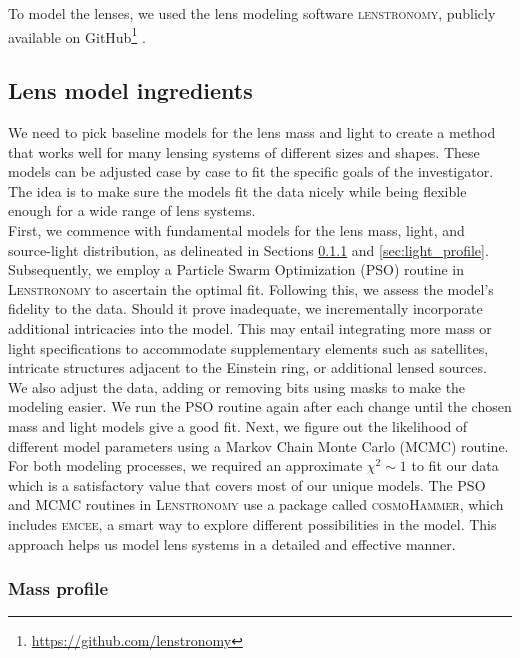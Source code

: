 \documentclass{aa}
\begin{document}
To model the lenses, we used the lens modeling software \textsc{lenstronomy}, publicly available on GitHub\footnote{\url{https://github.com/lenstronomy}} \citep{Birrer15, Birrer18}.

\subsection{Lens model ingredients}
We need to pick baseline models for the lens mass and light to create a method that works well for many lensing systems of different sizes and shapes. These models can be adjusted case by case to fit the specific goals of the investigator. The idea is to make sure the models fit the data nicely while being flexible enough for a wide range of lens systems.\\

First, we commence with fundamental models for the lens mass, light, and source-light distribution, as delineated in Sections \ref{sec:mass_profile} and \ref{sec:light_profile}. Subsequently, we employ a Particle Swarm Optimization (PSO) routine in \textsc{Lenstronomy} to ascertain the optimal fit. Following this, we assess the model's fidelity to the data. Should it prove inadequate, we incrementally incorporate additional intricacies into the model. This may entail integrating more mass or light specifications to accommodate supplementary elements such as satellites, intricate structures adjacent to the Einstein ring, or additional lensed sources.\\

We also adjust the data, adding or removing bits using masks to make the modeling easier. We run the PSO routine again after each change until the chosen mass and light models give a good fit. Next, we figure out the likelihood of different model parameters using a Markov Chain Monte Carlo (MCMC) routine. For both modeling processes, we required an approximate $\chi^2\sim 1$ to fit our data which is a satisfactory value that covers most of our unique models. The PSO and MCMC routines in \textsc{Lenstronomy} use a package called \textsc{cosmoHammer}, which includes \textsc{emcee}, a smart way to explore different possibilities in the model. This approach helps us model lens systems in a detailed and effective manner.


\subsubsection{Mass profile} \label{sec:mass_profile}
\end{document}
